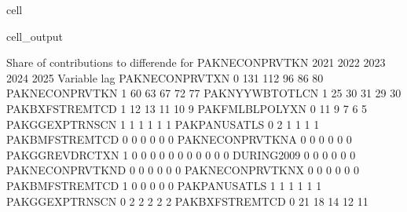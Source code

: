 \documentclass[letterpaper,10pt,english]{jupyterBook}
\begin{document}
\begin{sphinxuseclass}{cell}
\begin{sphinxVerbatimOutput}
\begin{sphinxuseclass}{cell_output}
\begin{sphinxVerbatim}[commandchars=\\\{\}]
 Share of contributions to differende for  PAKNECONPRVTKN
                            2021        2022        2023        2024        2025
Variable         lag                                                            
PAKNECONPRVTXN    0         131\PYGZpc{}        112\PYGZpc{}         96\PYGZpc{}         86\PYGZpc{}         80\PYGZpc{}
PAKNECONPRVTKN   \PYGZhy{}1          60\PYGZpc{}         63\PYGZpc{}         67\PYGZpc{}         72\PYGZpc{}         77\PYGZpc{}
PAKNYYWBTOTLCN   \PYGZhy{}1          25\PYGZpc{}         30\PYGZpc{}         31\PYGZpc{}         29\PYGZpc{}         30\PYGZpc{}
PAKBXFSTREMTCD   \PYGZhy{}1          12\PYGZpc{}         13\PYGZpc{}         11\PYGZpc{}         10\PYGZpc{}          9\PYGZpc{}
PAKFMLBLPOLYXN    0          11\PYGZpc{}          9\PYGZpc{}          7\PYGZpc{}          6\PYGZpc{}          5\PYGZpc{}
PAKGGEXPTRNSCN   \PYGZhy{}1           1\PYGZpc{}          1\PYGZpc{}          1\PYGZpc{}          1\PYGZpc{}          1\PYGZpc{}
PAKPANUSATLS      0           2\PYGZpc{}          1\PYGZpc{}          1\PYGZpc{}          1\PYGZpc{}          1\PYGZpc{}
PAKBMFSTREMTCD    0           0\PYGZpc{}          0\PYGZpc{}          0\PYGZpc{}          0\PYGZpc{}          0\PYGZpc{}
PAKNECONPRVTKN\PYGZus{}A  0           0\PYGZpc{}          0\PYGZpc{}          0\PYGZpc{}          0\PYGZpc{}          0\PYGZpc{}
PAKGGREVDRCTXN   \PYGZhy{}1           0\PYGZpc{}          0\PYGZpc{}          0\PYGZpc{}          0\PYGZpc{}          0\PYGZpc{}
                  0           0\PYGZpc{}          0\PYGZpc{}          0\PYGZpc{}          0\PYGZpc{}          0\PYGZpc{}
DURING\PYGZus{}2009       0           0\PYGZpc{}          0\PYGZpc{}          0\PYGZpc{}          0\PYGZpc{}          0\PYGZpc{}
PAKNECONPRVTKN\PYGZus{}D  0           0\PYGZpc{}          0\PYGZpc{}          0\PYGZpc{}          0\PYGZpc{}          0\PYGZpc{}
PAKNECONPRVTKN\PYGZus{}X  0           0\PYGZpc{}          0\PYGZpc{}          0\PYGZpc{}          0\PYGZpc{}          0\PYGZpc{}
PAKBMFSTREMTCD   \PYGZhy{}1          \PYGZhy{}0\PYGZpc{}         \PYGZhy{}0\PYGZpc{}         \PYGZhy{}0\PYGZpc{}         \PYGZhy{}0\PYGZpc{}         \PYGZhy{}0\PYGZpc{}
PAKPANUSATLS     \PYGZhy{}1          \PYGZhy{}1\PYGZpc{}         \PYGZhy{}1\PYGZpc{}         \PYGZhy{}1\PYGZpc{}         \PYGZhy{}1\PYGZpc{}         \PYGZhy{}1\PYGZpc{}
PAKGGEXPTRNSCN    0          \PYGZhy{}2\PYGZpc{}         \PYGZhy{}2\PYGZpc{}         \PYGZhy{}2\PYGZpc{}         \PYGZhy{}2\PYGZpc{}         \PYGZhy{}2\PYGZpc{}
PAKBXFSTREMTCD    0         \PYGZhy{}21\PYGZpc{}        \PYGZhy{}18\PYGZpc{}        \PYGZhy{}14\PYGZpc{}        \PYGZhy{}12\PYGZpc{}        \PYGZhy{}11\PYGZpc{}

\end{sphinxVerbatim}
\end{sphinxuseclass}
\end{sphinxVerbatimOutput}
\end{sphinxuseclass}
\end{document}
